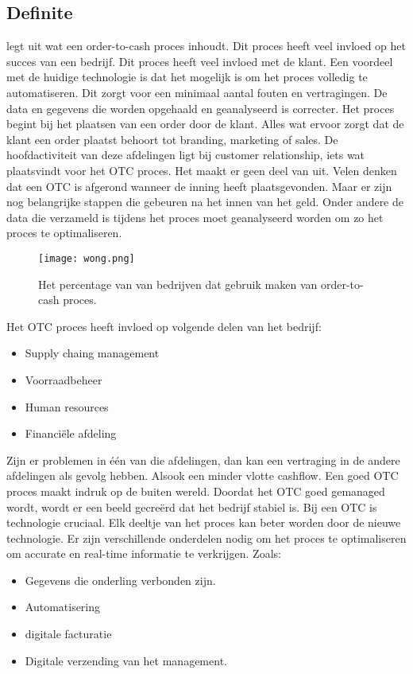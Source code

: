 \subsection{Definite}
\textcite{Wong2018} legt uit wat een order-to-cash proces inhoudt. Dit proces heeft veel invloed op het succes van een bedrijf. Dit proces heeft veel invloed met de klant. Een voordeel met de huidige technologie is dat het mogelijk is om het proces volledig te automatiseren. Dit zorgt voor een minimaal aantal fouten en vertragingen. De data en gegevens die worden opgehaald en geanalyseerd is correcter. 
Het proces begint bij het plaatsen van een order door de klant. Alles wat ervoor zorgt dat de klant een order plaatst behoort tot branding, marketing of sales. De hoofdactiviteit van deze afdelingen ligt bij customer relationship, iets wat plaatsvindt voor het OTC proces. Het maakt er geen deel van uit. 
Velen denken dat een OTC is afgerond wanneer de inning heeft plaatsgevonden. Maar er zijn nog belangrijke stappen die gebeuren na het innen van het geld. Onder andere de data die verzameld is tijdens het proces moet geanalyseerd worden om zo het proces te optimaliseren. 
\begin{figure}[h]
	\texttt{[image: wong.png]}
	\caption{Het percentage van van bedrijven dat gebruik maken van order-to-cash proces. \textcite{Wong2018}}
	\centering
\end{figure}
Het OTC proces heeft invloed op volgende delen van het bedrijf:
\begin{itemize}
	\item Supply chaing management
	\item Voorraadbeheer
	\item Human resources
	\item Financiële afdeling
\end{itemize}
Zijn er problemen in één van die afdelingen, dan kan een vertraging in de andere afdelingen als gevolg hebben. Alsook een minder vlotte cashflow. 
Een goed OTC proces maakt indruk op de buiten wereld. Doordat het OTC goed gemanaged wordt, wordt er een beeld gecreërd dat het bedrijf stabiel is. 
Bij een OTC is technologie cruciaal. Elk deeltje van het proces kan beter worden door de nieuwe  technologie. Er zijn verschillende onderdelen nodig om het proces te optimaliseren om accurate en real-time informatie te verkrijgen. Zoals: 
\begin{itemize}
	\item Gegevens die onderling verbonden zijn.
	\item Automatisering
	\item digitale facturatie
	\item Digitale verzending van het management.
\end{itemize}

